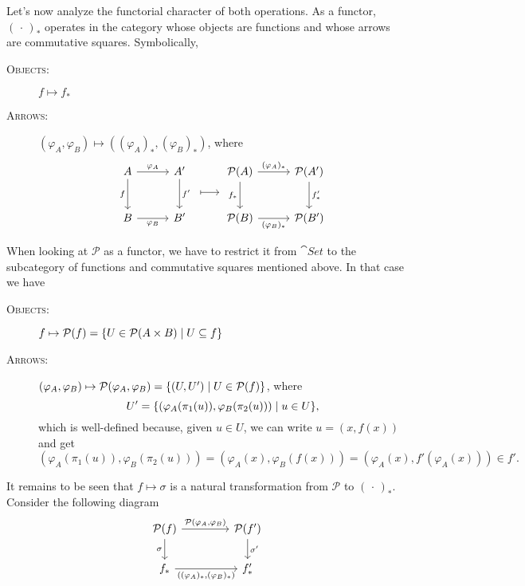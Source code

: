 Let's now analyze the functorial character of both operations. As a functor, $(\,\cdot\,)_*$ operates in the category whose objects are functions and whose arrows are commutative squares. Symbolically,
\begin{description}
    \item[\rm\textsc{Objects:}] $f\mapsto f_*$
    \item[\rm\textsc{Arrows:}] $(\varphi_A,\varphi_B)\mapsto((\varphi_A)_*,(\varphi_B)_*)$, where
    $$
        \begin{tikzcd}[row sep=0.3cm, column sep={0.4cm,0.6cm}]
            A
                    \arrow[dd,"f"']
                    \arrow[r,"\varphi_A"]
                &A'
                    \arrow[dd,"f'"]
                &\mathcal P(A)
                    \arrow[r,"(\varphi_A)_*"]
                    \arrow[dd,"f_*"']
                &\mathcal P(A')
                    \arrow[dd,"f'_*"]\\
                &{}
                    \arrow[r,mapsto,shorten >= 0.5cm, shorten <= 0.5cm]
                &{}\\
            B
                    \arrow[r,"\varphi_B"']
                &B'
                &\mathcal P(B)
                    \arrow[r,"(\varphi_B)_*"']
                &\mathcal P(B')
        \end{tikzcd}
    $$
\end{description}
When looking at $\mathcal P$ as a functor, we have to restrict it from $\cat{Set}$ to the subcategory of functions and commutative squares mentioned above. In that case we have
\begin{description}
    \item[\rm\textsc{Objects:}] $f\mapsto\mathcal P(f)=\{U\in\mathcal P(A\times B)\mid U\subseteq f\}$
    \item[\rm\textsc{Arrows:}] $(\varphi_A,\varphi_B)\mapsto\mathcal P(\varphi_A,\varphi_B)
    = \{(U,U')\mid U\in\mathcal P(f)\}$, where
    $$
        U' = \{(\varphi_A(\pi_1(u)),\varphi_B(\pi_2(u)))\mid u\in U\},
    $$
    which is well-defined because, given $u\in U$, we can write $u=(x,f(x))$ and get
    $$
        (\varphi_A(\pi_1(u)),\varphi_B(\pi_2(u)))
        = (\varphi_A(x),\varphi_B(f(x)))
        = (\varphi_A(x),f'(\varphi_A(x)))\in f'.
    $$
\end{description}
It remains to be seen that $f\mapsto\sigma$ is a natural transformation from $\mathcal P$ to $(\,\cdot\,)_*$. Consider the following diagram
$$
    \begin{tikzcd}[column sep={1.5cm}]
        \mathcal P(f)
                \arrow[r,"{\mathcal P(\varphi_A,\varphi_B)}"]
                \arrow[d,"\sigma"']
            &\mathcal P(f')
                \arrow[d,"\sigma'"]\\
        f_*
                \arrow[r,"{((\varphi_A)_*,(\varphi_B)_*)}"']
            &f'_*
    \end{tikzcd}
$$
